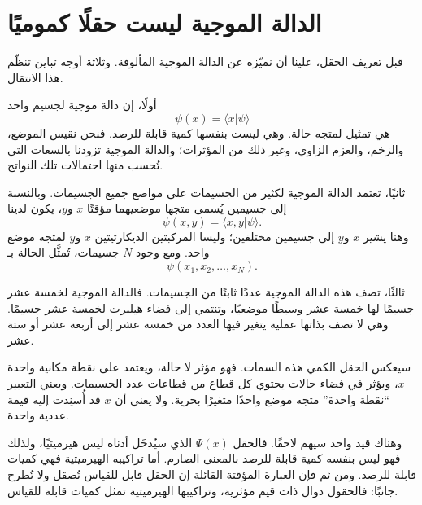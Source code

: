 \section{الدالة الموجية ليست حقلًا كموميًا}

قبل تعريف الحقل، علينا أن نميّزه عن الدالة الموجية المألوفة. وثلاثة أوجه تباين تنظّم هذا الانتقال.

أولًا، إن دالة موجية لجسيم واحد
\begin{equation}
\psi(x)=\langle x|\psi\rangle
\end{equation}
هي تمثيل لمتجه حالة. وهي ليست بنفسها كمية قابلة للرصد. فنحن نقيس الموضع، والزخم، والعزم الزاوي، وغير ذلك من المؤثرات؛ والدالة الموجية تزودنا بالسعات التي تُحسب منها احتمالات تلك النواتج.

ثانيًا، تعتمد الدالة الموجية لكثير من الجسيمات على مواضع جميع الجسيمات. وبالنسبة إلى جسيمين يُسمى متجها موضعيهما مؤقتًا \(x\) و\(y\)، يكون لدينا
\begin{equation}
\psi(x,y)=\langle x,y|\psi\rangle.
\end{equation}
وهنا يشير \(x\) و\(y\) إلى جسيمين مختلفين؛ وليسا المركبتين الديكارتيتين \(x\) و\(y\) لمتجه موضع واحد. ومع وجود \(N\) جسيمات، تُمثَّل الحالة بـ
\begin{equation}
\psi(x_1,x_2,\ldots,x_N).
\end{equation}

ثالثًا، تصف هذه الدالة الموجية عددًا ثابتًا من الجسيمات. فالدالة الموجية لخمسة عشر جسيمًا لها خمسة عشر وسيطًا موضعيًا، وتنتمي إلى فضاء هيلبرت لخمسة عشر جسيمًا. وهي لا تصف بذاتها عملية يتغير فيها العدد من خمسة عشر إلى أربعة عشر أو ستة عشر.

سيعكس الحقل الكمي هذه السمات. فهو مؤثر لا حالة، ويعتمد على نقطة مكانية واحدة \(x\)، ويؤثر في فضاء حالات يحتوي كل قطاع من قطاعات عدد الجسيمات. ويعني التعبير ``نقطة واحدة'' متجه موضع واحدًا متغيرًا بحرية. ولا يعني أن \(x\) قد أُسنِدت إليه قيمة عددية واحدة.

وهناك قيد واحد سيهم لاحقًا. فالحقل \(\Psi(x)\) الذي سيُدخَل أدناه ليس هيرميتيًا، ولذلك فهو ليس بنفسه كمية قابلة للرصد بالمعنى الصارم. أما تراكيبه الهيرميتية فهي كميات قابلة للرصد. ومن ثم فإن العبارة المؤقتة القائلة إن الحقل قابل للقياس تُصقل ولا تُطرح جانبًا: فالحقول دوال ذات قيم مؤثرية، وتراكيبها الهيرميتية تمثل كميات قابلة للقياس.

\begin{classroomqa}
\end{classroomqa}

